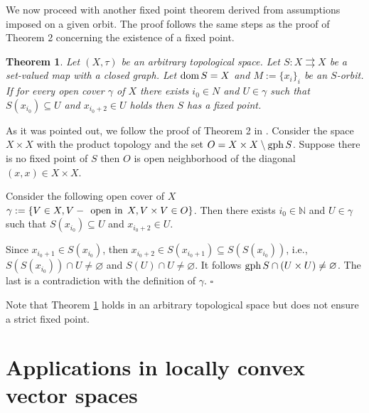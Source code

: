 \documentclass{article}
\def\dom{\mathop{\rm dom}}
\def\gph{\mathop{\rm gph}}
\renewcommand{\emptyset}{\varnothing}
\def\dom{\mathop{\rm dom}}
\def\gph{\mathop{\rm gph}}
\def\dom{\mathop{\rm dom}}
\def\text#1{\,\;\hbox{#1}\;\,}
\newcommand{\N}{\mathbb{N}}
\renewenvironment{proof}
         {\begin{trivlist}\item[
         {\bf Proof.}]}{{\hfill $\square$} \end{trivlist}}
\newtheorem{theo}{Theorem}[section]
\begin{document}
We now proceed with another fixed point theorem derived from assumptions imposed on a given orbit. The proof follows the same steps as the proof of Theorem 2 \cite{Kupka_Sl} concerning the existence of a fixed point. 
\begin{theo} \label{generalization} Let $(X,\tau)$ be an arbitrary topological space. Let $S: X \rightrightarrows X$ be a set-valued map with a closed graph. Let $\dom S=X$ and  $M:=\{x_i\}_i$ be an $S$-orbit. If for every open cover $\gamma$ of $X$ there exists $i_0 \in N$ and $U \in \gamma$ such that $S(x_{i_0}) \subseteq U$ and $x_{i_0+2} \in U$ holds then $S$ has a fixed point.
\end{theo}
\begin{proof} As it was pointed out, we follow the proof of Theorem 2 in \cite{Kupka_Sl}. Consider the space $X \times X$ with the product topology and the set $O = X \times X \setminus \gph S$. Suppose there is no fixed point of $S$ then $O$ is open neighborhood of the diagonal $(x,x) \in X \times X$. 

Consider the following open cover of $X$ $\gamma:=\{V \in X, V - \text{open in} X, V \times V \in O\}$. Then there exists $i_0 \in \N$ and $U \in \gamma$ such that $S(x_{i_0}) \subseteq U$ and $x_{i_0+2} \in U$. 

Since $x_{i_0+1} \in S(x_{i_0})$, then $x_{i_0+2} \in S(x_{i_0+1}) \subseteq S(S(x_{i_0}))$, i.e., $S(S(x_{i_0})) \cap U \neq \emptyset$ and $S(U) \cap U \neq \emptyset$. It follows $\gph S \cap (U \times U) \neq \emptyset$. The last is a contradiction with the definition of $\gamma$.  
\end{proof}
Note that Theorem \ref{generalization} holds in an arbitrary topological space but does not ensure a strict fixed point.


\section{Applications in locally convex vector spaces}
\end{document}
